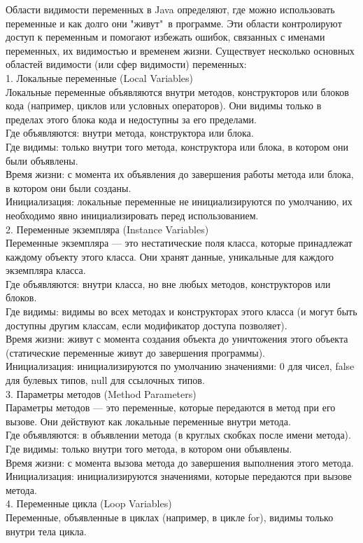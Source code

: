 \noindent Области видимости переменных в Java определяют, где можно использовать переменные и как долго они "живут"\, в программе. Эти области контролируют доступ к переменным и помогают избежать ошибок, связанных с именами переменных, их видимостью и временем жизни. Существует несколько основных областей видимости (или сфер видимости) переменных: \\
1. Локальные переменные (Local Variables) \\
Локальные переменные объявляются внутри методов, конструкторов или блоков кода (например, циклов или условных операторов). Они видимы только в пределах этого блока кода и недоступны за его пределами. \\
Где объявляются: внутри метода, конструктора или блока. \\
Где видимы: только внутри того метода, конструктора или блока, в котором они были объявлены. \\
Время жизни: с момента их объявления до завершения работы метода или блока, в котором они были созданы. \\
Инициализация: локальные переменные не инициализируются по умолчанию, их необходимо явно инициализировать перед использованием. \\
2. Переменные экземпляра (Instance Variables) \\
Переменные экземпляра — это нестатические поля класса, которые принадлежат каждому объекту этого класса. Они хранят данные, уникальные для каждого экземпляра класса. \\
Где объявляются: внутри класса, но вне любых методов, конструкторов или блоков. \\
Где видимы: видимы во всех методах и конструкторах этого класса (и могут быть доступны другим классам, если модификатор доступа позволяет). \\
Время жизни: живут с момента создания объекта до уничтожения этого объекта (статические переменные живут до завершения программы). \\
Инициализация: инициализируются по умолчанию значениями: 0 для чисел, false для булевых типов, null для ссылочных типов. \\
3. Параметры методов (Method Parameters) \\
Параметры методов — это переменные, которые передаются в метод при его вызове. Они действуют как локальные переменные внутри метода. \\
Где объявляются: в объявлении метода (в круглых скобках после имени метода). \\
Где видимы: только внутри того метода, в котором они объявлены. \\
Время жизни: с момента вызова метода до завершения выполнения этого метода. \\
Инициализация: инициализируются значениями, которые передаются при вызове метода. \\
4. Переменные цикла (Loop Variables) \\
Переменные, объявленные в циклах (например, в цикле for), видимы только внутри тела цикла.
